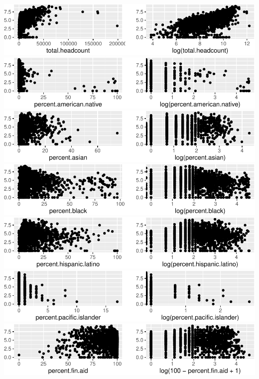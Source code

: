 \documentclass[
]{article}
\begin{document}
\includegraphics{final_files/figure-latex/unnamed-chunk-12-1.pdf}
\includegraphics{final_files/figure-latex/unnamed-chunk-12-2.pdf}
\includegraphics{final_files/figure-latex/unnamed-chunk-12-3.pdf}
\includegraphics{final_files/figure-latex/unnamed-chunk-12-4.pdf}
\includegraphics{final_files/figure-latex/unnamed-chunk-12-5.pdf}
\includegraphics{final_files/figure-latex/unnamed-chunk-12-6.pdf}
\includegraphics{final_files/figure-latex/unnamed-chunk-12-7.pdf}
\end{document}

